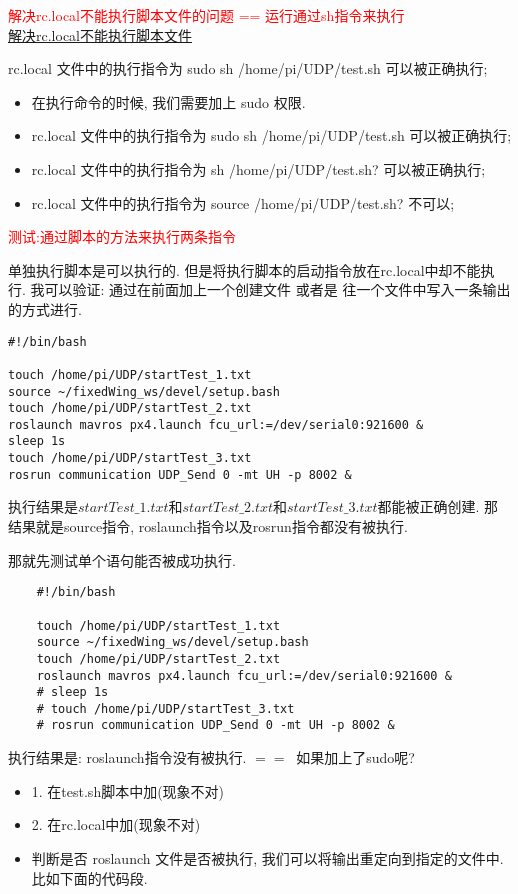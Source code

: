 \textcolor{red}{解决rc.local不能执行脚本文件的问题 == 运行通过sh指令来执行}\\
\href{https://blog.csdn.net/liuwinner/article/details/91040565}{解决rc.local不能执行脚本文件}

rc.local 文件中的执行指令为 sudo sh /home/pi/UDP/test.sh 可以被正确执行;

\begin{itemize}
    \item 在执行命令的时候, 我们需要加上 sudo 权限. 
    \item rc.local 文件中的执行指令为 sudo sh /home/pi/UDP/test.sh 可以被正确执行;
    \item rc.local 文件中的执行指令为 sh /home/pi/UDP/test.sh? 可以被正确执行;
    \item rc.local 文件中的执行指令为 source /home/pi/UDP/test.sh? 不可以;
\end{itemize}
\textcolor{red}{测试:通过脚本的方法来执行两条指令}
\par
单独执行脚本是可以执行的. 但是将执行脚本的启动指令放在rc.local中却不能执行.
我可以验证: 通过在前面加上一个创建文件 或者是 往一个文件中写入一条输出的方式进行. 
\begin{lstlisting}
#!/bin/bash

touch /home/pi/UDP/startTest_1.txt
source ~/fixedWing_ws/devel/setup.bash
touch /home/pi/UDP/startTest_2.txt
roslaunch mavros px4.launch fcu_url:=/dev/serial0:921600 &
sleep 1s
touch /home/pi/UDP/startTest_3.txt
rosrun communication UDP_Send 0 -mt UH -p 8002 &

\end{lstlisting}
执行结果是$startTest\_1.txt$和$startTest\_2.txt$和$startTest\_3.txt$都能被正确创建.
那结果就是source指令, roslaunch指令以及rosrun指令都没有被执行.

那就先测试单个语句能否被成功执行.
\begin{lstlisting}
    #!/bin/bash
    
    touch /home/pi/UDP/startTest_1.txt
    source ~/fixedWing_ws/devel/setup.bash
    touch /home/pi/UDP/startTest_2.txt
    roslaunch mavros px4.launch fcu_url:=/dev/serial0:921600 &
    # sleep 1s
    # touch /home/pi/UDP/startTest_3.txt
    # rosrun communication UDP_Send 0 -mt UH -p 8002 &
\end{lstlisting}
执行结果是: roslaunch指令没有被执行. $==\>$ 如果加上了sudo呢? 
\begin{itemize}
    \item 1. 在test.sh脚本中加(现象不对)
    \item 2. 在rc.local中加(现象不对)
    \item 判断是否 roslaunch 文件是否被执行, 我们可以将输出重定向到指定的文件中. 比如下面的代码段. 
\end{itemize}

